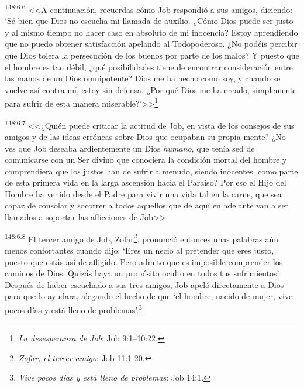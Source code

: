 \par 
\textsuperscript{148:6.6} <<A continuación, recuerdas cómo Job respondió a sus amigos, diciendo: `Sé bien que Dios no escucha mi llamada de auxilio. ¿Cómo Dios puede ser justo y al mismo tiempo no hacer caso en absoluto de mi inocencia? Estoy aprendiendo que no puedo obtener satisfacción apelando al Todopoderoso. ¿No podéis percibir que Dios tolera la persecución de los buenos por parte de los malos? Y puesto que el hombre es tan débil, ¿qué posibilidades tiene de encontrar consideración entre las manos de un Dios omnipotente? Dios me ha hecho como soy, y cuando se vuelve así contra mí, estoy sin defensa. ¿Por qué Dios me ha creado, simplemente para sufrir de esta manera miserable?'>>\footnote{\textit{La desesperanza de Job}: Job 9:1--10:22.}

\par 
\textsuperscript{148:6.7} <<¿Quién puede criticar la actitud de Job, en vista de los consejos de sus amigos y de las ideas erróneas sobre Dios que ocupaban su propia mente? ¿No ves que Job deseaba ardientemente un Dios \textit{humano}, que tenía sed de comunicarse con un Ser divino que conociera la condición mortal del hombre y comprendiera que los justos han de sufrir a menudo, siendo inocentes, como parte de esta primera vida en la larga ascensión hacia el Paraíso? Por eso el Hijo del Hombre ha venido desde el Padre para vivir una vida tal en la carne, que sea capaz de consolar y socorrer a todos aquellos que de aquí en adelante van a ser llamados a soportar las aflicciones de Job>>.

\par 
\textsuperscript{148:6.8} \guillemotleft El tercer amigo de Job, Zofar\footnote{\textit{Zofar, el tercer amigo}: Job 11:1-20.}, pronunció entonces unas palabras aún menos confortantes cuando dijo: `Eres un necio al pretender que eres justo, puesto que estás así de afligido. Pero admito que es imposible comprender los caminos de Dios. Quizás haya un propósito oculto en todos tus sufrimientos'. Después de haber escuchado a sus tres amigos, Job apeló directamente a Dios para que lo ayudara, alegando el hecho de que `el hombre, nacido de mujer, vive pocos días y está lleno de problemas'.\guillemotright\footnote{\textit{Vive pocos días y está lleno de problemas}: Job 14:1.}

